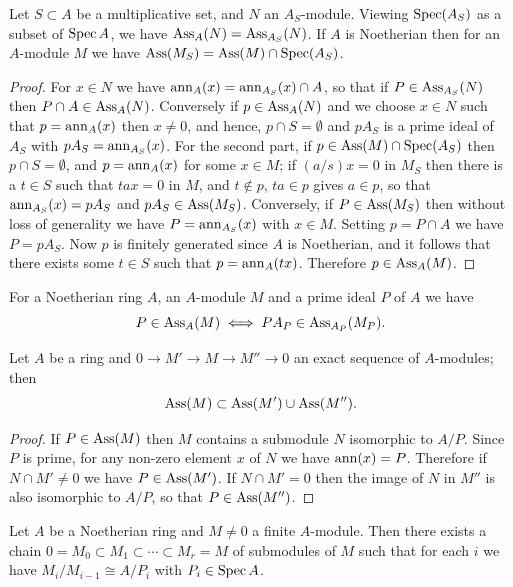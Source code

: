 \begin{theorem}\label{thm:6.2}
Let $S \subset A$ be a multiplicative set, and $N$ an $A_S$-module.
Viewing $\operatorname{Spec}(A_S)$ as a subset of $\operatorname{Spec} A$, we have $\operatorname{Ass}_A(N) = \operatorname{Ass}_{A_S}(N)$. If $A$
is Noetherian then for an $A$-module $M$ we have $\operatorname{Ass}(M_S) =
\operatorname{Ass}(M) \cap \operatorname{Spec}(A_S)$.
\end{theorem}

\begin{proof}
For $x \in N$ we have $\operatorname{ann}_A(x) = \operatorname{ann}_{A_S}(x) \cap A$, so that if $P \in \operatorname{Ass}_{A_S}(N)$
then $P \cap A \in \operatorname{Ass}_A(N)$. Conversely if $p \in \operatorname{Ass}_A(N)$ and we choose $x \in N$
such that $p = \operatorname{ann}_A(x)$ then $x \neq 0$, and hence, $p \cap S = \emptyset$ and $pA_S$ is a prime
ideal of $A_S$ with $pA_S = \operatorname{ann}_{A_S}(x)$. For the second part, if $p \in \operatorname{Ass}(M) \cap
\operatorname{Spec}(A_S)$ then $p \cap S = \emptyset$, and $p = \operatorname{ann}_A(x)$ for some $x \in M$; if $(a/s)x = 0$ in
$M_S$ then there is a $t \in S$ such that $tax = 0$ in $M$, and $t \notin p$, $ta \in p$ gives
$a \in p$, so that $\operatorname{ann}_{A_S}(x) = pA_S$ and $pA_S \in \operatorname{Ass}(M_S)$. Conversely, if $P \in
\operatorname{Ass}(M_S)$ then without loss of generality we have $P = \operatorname{ann}_{A_S}(x)$ with $x \in M$.
Setting $p = P \cap A$ we have $P = pA_S$. Now $p$ is finitely generated since $A$ is
Noetherian, and it follows that there exists some $t \in S$ such that $p =
\operatorname{ann}_A(tx)$. Therefore $p \in \operatorname{Ass}_A(M)$.
\end{proof}

\begin{corollary*}
For a Noetherian ring $A$, an $A$-module $M$ and a prime ideal $P$ of
$A$ we have
\[
  P \in \operatorname{Ass}_A(M) \iff PA_P \in \operatorname{Ass}_{A_P}(M_P).
\]
\end{corollary*}

\begin{theorem}\label{thm:6.3}
Let $A$ be a ring and $0 \to M' \to M \to M'' \to 0$ an exact
sequence of $A$-modules; then
\[
  \operatorname{Ass}(M) \subset \operatorname{Ass}(M') \cup \operatorname{Ass}(M'').
\]
\end{theorem}

\begin{proof}
If $P \in \operatorname{Ass}(M)$ then $M$ contains a submodule $N$ isomorphic to $A/P$.
Since $P$ is prime, for any non-zero element $x$ of $N$ we have $\operatorname{ann}(x) = P$.
Therefore if $N \cap M' \neq 0$ we have $P \in \operatorname{Ass}(M')$. If $N \cap M' = 0$ then the image
of $N$ in $M''$ is also isomorphic to $A/P$, so that $P \in \operatorname{Ass}(M'')$.
\end{proof}

\begin{theorem}\label{thm:6.4}
Let $A$ be a Noetherian ring and $M \neq 0$ a finite $A$-module.
Then there exists a chain $0 = M_0 \subset M_1 \subset \cdots \subset M_r = M$ of submodules of $M$
such that for each $i$ we have $M_i/M_{i-1} \cong A/P_i$ with $P_i \in \operatorname{Spec} A$.
\end{theorem}

